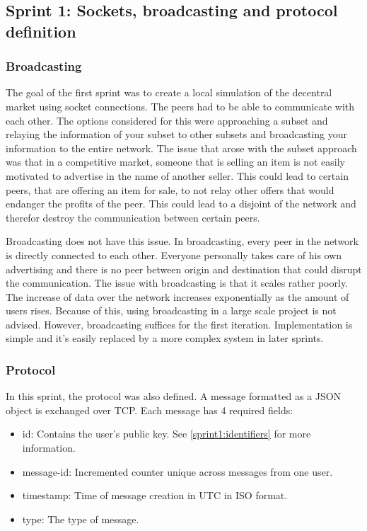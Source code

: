 \documentclass[]{article}
\newenvironment{myitemize}
{ \begin{itemize}
    \setlength{\itemsep}{0pt}
    \setlength{\parskip}{0pt}
    \setlength{\parsep}{0pt}     }
{ \end{itemize}                  }
\begin{document}
\subsection{Sprint 1: Sockets, broadcasting and protocol definition}
\subsubsection{Broadcasting}
The goal of the first sprint was to create a local simulation of the decentral market using socket connections.
The peers had to be able to communicate with each other.
The options considered for this were approaching a subset and relaying the information of your subset to other subsets and broadcasting your information to the entire network.
The issue that arose with the subset approach was that in a competitive market, someone that is selling an item is not easily motivated to advertise in the name of another seller.
This could lead to certain peers, that are offering an item for sale, to not relay other offers that would endanger the profits of the peer.
This could lead to a disjoint of the network and therefor destroy the communication between certain peers.

Broadcasting does not have this issue.
In broadcasting, every peer in the network is directly connected to each other.
Everyone personally takes care of his own advertising and there is no peer between origin and destination that could disrupt the communication.
The issue with broadcasting is that it scales rather poorly.
The increase of data over the network increases exponentially as the amount of users rises.
Because of this, using broadcasting in a large scale project is not advised.
However, broadcasting suffices for the first iteration.
Implementation is simple and it's easily replaced by a more complex system in later sprints.

\subsubsection{Protocol}

In this sprint, the protocol was also defined.
A message formatted as a JSON object is exchanged over TCP.
Each message has 4 required fields:
\begin{myitemize}
\item id: Contains the user's public key. See \ref{sprint1:identifiers} for more information.
\item message-id: Incremented counter unique across messages from one user.
\item timestamp: Time of message creation in UTC in ISO format.
\item type: The type of message.
\end{myitemize}
\end{document}
